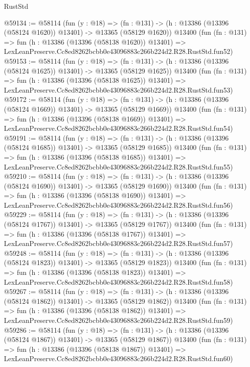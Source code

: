 \begin{lexlean}{RustStd}
\begin{coremodule}
@59134 := @58114
    (fun (y : @18) =>
    (fn : @131) -> (h : @13386 (@13396 (@58124 @1620)) @13401) -> @13365 (@58129 @1620))
    @13400
    (fun (fn : @131) =>
    fun (h : @13386 (@13396 (@58138 @1620)) @13401) =>
    LexLeanPreserve.Cc8ed8262bcbb0e43096883c266b224d2.R28.RustStd.fun52)
@59153 := @58114
    (fun (y : @18) =>
    (fn : @131) -> (h : @13386 (@13396 (@58124 @1625)) @13401) -> @13365 (@58129 @1625))
    @13400
    (fun (fn : @131) =>
    fun (h : @13386 (@13396 (@58138 @1625)) @13401) =>
    LexLeanPreserve.Cc8ed8262bcbb0e43096883c266b224d2.R28.RustStd.fun53)
@59172 := @58114
    (fun (y : @18) =>
    (fn : @131) -> (h : @13386 (@13396 (@58124 @1669)) @13401) -> @13365 (@58129 @1669))
    @13400
    (fun (fn : @131) =>
    fun (h : @13386 (@13396 (@58138 @1669)) @13401) =>
    LexLeanPreserve.Cc8ed8262bcbb0e43096883c266b224d2.R28.RustStd.fun54)
@59191 := @58114
    (fun (y : @18) =>
    (fn : @131) -> (h : @13386 (@13396 (@58124 @1685)) @13401) -> @13365 (@58129 @1685))
    @13400
    (fun (fn : @131) =>
    fun (h : @13386 (@13396 (@58138 @1685)) @13401) =>
    LexLeanPreserve.Cc8ed8262bcbb0e43096883c266b224d2.R28.RustStd.fun55)
@59210 := @58114
    (fun (y : @18) =>
    (fn : @131) -> (h : @13386 (@13396 (@58124 @1690)) @13401) -> @13365 (@58129 @1690))
    @13400
    (fun (fn : @131) =>
    fun (h : @13386 (@13396 (@58138 @1690)) @13401) =>
    LexLeanPreserve.Cc8ed8262bcbb0e43096883c266b224d2.R28.RustStd.fun56)
@59229 := @58114
    (fun (y : @18) =>
    (fn : @131) -> (h : @13386 (@13396 (@58124 @1767)) @13401) -> @13365 (@58129 @1767))
    @13400
    (fun (fn : @131) =>
    fun (h : @13386 (@13396 (@58138 @1767)) @13401) =>
    LexLeanPreserve.Cc8ed8262bcbb0e43096883c266b224d2.R28.RustStd.fun57)
@59248 := @58114
    (fun (y : @18) =>
    (fn : @131) -> (h : @13386 (@13396 (@58124 @1823)) @13401) -> @13365 (@58129 @1823))
    @13400
    (fun (fn : @131) =>
    fun (h : @13386 (@13396 (@58138 @1823)) @13401) =>
    LexLeanPreserve.Cc8ed8262bcbb0e43096883c266b224d2.R28.RustStd.fun58)
@59267 := @58114
    (fun (y : @18) =>
    (fn : @131) -> (h : @13386 (@13396 (@58124 @1862)) @13401) -> @13365 (@58129 @1862))
    @13400
    (fun (fn : @131) =>
    fun (h : @13386 (@13396 (@58138 @1862)) @13401) =>
    LexLeanPreserve.Cc8ed8262bcbb0e43096883c266b224d2.R28.RustStd.fun59)
@59286 := @58114
    (fun (y : @18) =>
    (fn : @131) -> (h : @13386 (@13396 (@58124 @1867)) @13401) -> @13365 (@58129 @1867))
    @13400
    (fun (fn : @131) =>
    fun (h : @13386 (@13396 (@58138 @1867)) @13401) =>
    LexLeanPreserve.Cc8ed8262bcbb0e43096883c266b224d2.R28.RustStd.fun60)

\end{coremodule}
\end{lexlean}
